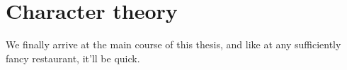\section{Character theory}
\label{char}

We finally arrive at the main course of this thesis, and like at any
sufficiently fancy restaurant, it'll be quick.